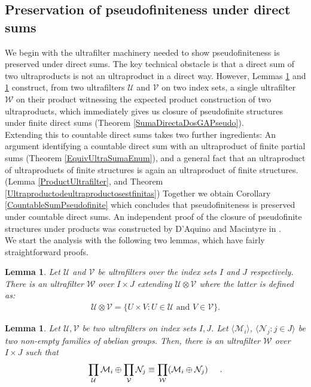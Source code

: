 \documentclass[11pt]{amsart}
\newtheorem{lema}[prop]{Lemma}
\theoremstyle{definition}
\newcommand{\bl}{\begin{lema}}
\newcommand{\el}{\end{lema}}
\newcommand{\U}{\mathcal{U}}
\begin{document}
\subsection{Preservation of pseudofiniteness under direct sums}
\label{Subsec:PsfDirectSums}
We begin with the ultrafilter machinery needed to show pseudofiniteness is preserved under direct sums. The key technical obstacle is that a direct sum of two ultraproducts is not an ultraproduct in a direct way. However, Lemmas \ref{FilterForDirectSum} and \ref{SumTwoUltraproducts} construct, from two ultrafilters $\mathcal{U}$ and $\mathcal{V}$ on two index sets, a single ultrafilter $\mathcal{W}$ on their product witnessing the expected product construction of two ultraproducts, which immediately gives us closure of pseudofinite structures under finite direct sums (Theorem \ref{SumaDirectaDosGAPseudo}).\\

Extending this to countable direct sums takes two further ingredients: An argument identifying a countable direct sum with an ultraproduct of finite partial sums (Theorem \ref{EquivUltraSumaEnum}), and a general fact that an ultraproduct of ultraproducts of finite structures is again an ultraproduct of finite structures. (Lemma \ref{ProductUltrafilter}, and Theorem \ref{Ultraproductodeultraproductosestfinitas}) Together we obtain Corollary \ref{CountableSumPseudofinite} which concludes that pseudofiniteness is preserved under countable direct sums. An independent proof of the closure of pseudofinite structures under products was constructed by D'Aquino and Macintyre in \cite{DAquino-Macintyre2026}.\\

We start the analysis with the following two lemmas, which have fairly straightforward proofs.

\bl \label{FilterForDirectSum} Let $\U$ and $\mathcal{V}$ be ultrafilters over the index sets $I$ and $J$ respectively. There is an ultrafilter $\mathcal{W}$ over $I\times J$ extending $\mathcal{U}\otimes \mathcal{V}$ where the latter is defined as:
\begin{align*}
    \mathcal{U}\otimes \mathcal{V} = \{ U\times V : U\in\mathcal{U} \text{ and } V\in\mathcal{V}\}.
\end{align*}
\el

\bl \label{SumTwoUltraproducts} Let $\mathcal{U},\mathcal{V}$ be two ultrafilters on index sets $I,J$. Let $\langle \mathcal{M}_i\rangle$, $\langle\mathcal{N}_{j} : j\in J\rangle$ be two non-empty families of abelian groups. Then, there is an ultrafilter  $\mathcal{W}$ over $I\times J$ such that
\begin{align*}
    \prod_{\mathcal{U}}\mathcal{M}_{i} \oplus \prod_{\mathcal{V}}\mathcal{N}_{j} \equiv \prod_{\mathcal{W}}  (\mathcal{M}_{i} \oplus \mathcal{N}_{j})\hspace{0.5cm}.
\end{align*}
\el
\end{document}
